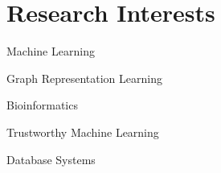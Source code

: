 
\section{Research Interests} 
\begin{multicols}{2}
    \begin{compactitem}
        \item Machine Learning
        \item Graph Representation Learning 
        \item Bioinformatics 
        \item Trustworthy Machine Learning
        \item Database Systems
    \end{compactitem}
\end{multicols}
